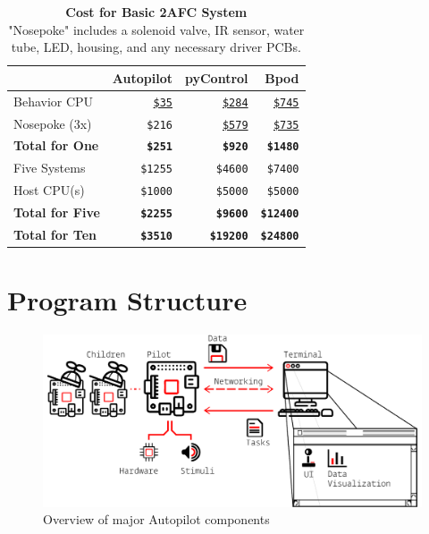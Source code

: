 \documentclass[nohyper, justified, notitlepage, marginals=raggedright,twoside=false,debug]{tufte-autopilot}
\begin{document}
\begin{table}
\caption{\textbf{Cost for Basic 2AFC System}\\
\noindent"Nosepoke" includes a solenoid valve, IR sensor, water tube, LED, housing, and any necessary driver PCBs.}
\label{tab:cost}
\noindent\begin{tabularx}{\linewidth}{XRRR}\toprule
& Autopilot & pyControl & Bpod  \\
\midrule
Behavior CPU & \href{https://www.adafruit.com/product/3775?src=raspberrypi}{\texttt{\$35}} & \href{http://www.open-ephys.org/store/pycontrol}{\texttt{\$284}} & \href{https://sanworks.io/shop/viewproduct?productID=1024}{\texttt{\$745}}\\
Nosepoke (3x) & \texttt{\$216} & \href{http://www.open-ephys.org/store/pycontrol-peripherals}{\texttt{\$579}} & \href{https://sanworks.io/shop/viewproduct?productID=1009}{\texttt{\$735}} \\
\textbf{Total for One} & \textbf{\texttt{\$251}} & \textbf{\texttt{\$920}} & \textbf{\texttt{\$1480}}\\
\midrule
Five Systems & \texttt{\$1255} & \texttt{\$4600} & \texttt{\$7400} \\
Host CPU(s) & \texttt{\$1000} & \texttt{\$5000} & \texttt{\$5000} \\
\textbf{Total for Five} & \textbf{\texttt{\$2255}} & \textbf{\texttt{\$9600}} & \textbf{\texttt{\$12400}} \\
\midrule
\textbf{Total for Ten} & \textbf{\texttt{\$3510}} & \textbf{\texttt{\$19200}} & \textbf{\texttt{\$24800}} \\
\bottomrule
\end{tabularx}
\end{table}

\chapter{Program Structure}
\label{sec:structure}

\begin{figure}
\includegraphics[]{figures/whole_system_black.pdf}
\caption{Overview of major Autopilot components}
\end{figure}
\end{document}
